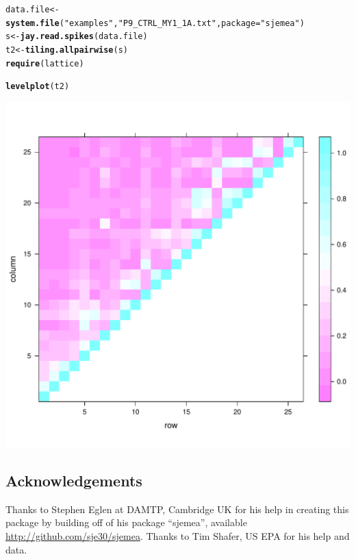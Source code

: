 \documentclass{article}\usepackage[]{graphicx}\usepackage[]{color}
\makeatletter
\def\maxwidth{ %
  \ifdim\Gin@nat@width>\linewidth
    \linewidth
  \else
    \Gin@nat@width
  \fi
}
\newcommand{\hlstr}[1]{\textcolor[rgb]{0.192,0.494,0.8}{#1}}%
\newcommand{\hlstd}[1]{\textcolor[rgb]{0.345,0.345,0.345}{#1}}%
\newcommand{\hlkwb}[1]{\textcolor[rgb]{0.69,0.353,0.396}{#1}}%
\newcommand{\hlkwc}[1]{\textcolor[rgb]{0.333,0.667,0.333}{#1}}%
\newcommand{\hlkwd}[1]{\textcolor[rgb]{0.737,0.353,0.396}{\textbf{#1}}}%
\newenvironment{kframe}{%
 \def\at@end@of@kframe{}%
 \ifinner\ifhmode%
  \def\at@end@of@kframe{\end{minipage}}%
  \begin{minipage}{\columnwidth}%
 \fi\fi%
 \def\FrameCommand##1{\hskip\@totalleftmargin \hskip-\fboxsep
 \colorbox{shadecolor}{##1}\hskip-\fboxsep
     \hskip-\linewidth \hskip-\@totalleftmargin \hskip\columnwidth}%
 \MakeFramed {\advance\hsize-\width
   \@totalleftmargin\z@ \linewidth\hsize
   \@setminipage}}%
 {\par\unskip\endMakeFramed%
 \at@end@of@kframe}
\newenvironment{knitrout}{}{} %
\makeatother
\begin{document}
\begin{knitrout}
\color{fgcolor}\begin{kframe}
\begin{alltt}
\hlstd{data.file} \hlkwb{<-} \hlkwd{system.file}\hlstd{(}\hlstr{"examples"}\hlstd{,} \hlstr{"P9_CTRL_MY1_1A.txt"}\hlstd{,} \hlkwc{package} \hlstd{=} \hlstr{"sjemea"}\hlstd{)}
\hlstd{s} \hlkwb{<-} \hlkwd{jay.read.spikes}\hlstd{(data.file)}
\hlstd{t2} \hlkwb{<-} \hlkwd{tiling.allpairwise}\hlstd{(s)}
\hlkwd{require}\hlstd{(lattice)}
\end{alltt}


{\ttfamily\noindent\itshape\color{messagecolor}{\#\# Loading required package: lattice}}\begin{alltt}
\hlkwd{levelplot}\hlstd{(t2)}
\end{alltt}
\end{kframe}
\includegraphics[width=\maxwidth]{figure/tiling-correlation} 

\end{knitrout}




\subsection*{Acknowledgements}
Thanks to Stephen Eglen at DAMTP, Cambridge UK for his help in creating this package by building off of his package ``sjemea'', available \url{http://github.com/sje30/sjemea}.  Thanks to Tim Shafer, US EPA for his help and data.
\end{document}
